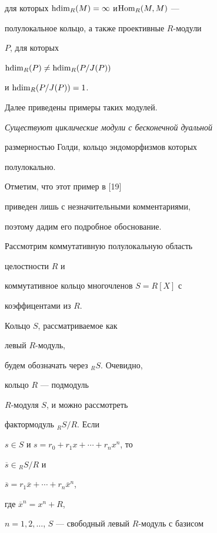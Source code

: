 для которых $\operatorname{hdim}_R(M)=\infty$ и\linebreak $\operatorname{Hom}_R(M,M)$ ---


полулокальное кольцо, а также проективные $R$-модули 


$P$, для которых\linebreak


$\operatorname{hdim}_R(P) \not =\operatorname{hdim}_R(P/J(P))$


и $\operatorname{hdim}_R(P/J(P))=1$. 


Далее приведены примеры таких модулей.





\begin{exam}


{\em Существуют циклические модули с бесконечной дуальной


размерностью Голди, кольцо эндоморфизмов которых


полулокально.}





Отметим, что этот пример в [19]


приведен лишь с незначительными комментариями,


поэтому дадим его подробное обоснование. 





Рассмотрим коммутативную полулокальную область 


целостности $R$ и 


коммутативное кольцо многочленов $S=R[X]$ с 


коэффицентами из $R$. 


Кольцо $S$, рассматриваемое как 


левый $R$-модуль,


будем обозначать через ${_R}S$. Очевидно,


кольцо $R$ --- подмодуль 


$R$-модуля $S$, и можно рассмотреть 


фактормодуль ${_R}S/R$. Если 


$s \in S$ и $s=r_0+r_1 x+ \dotsb +r_n x^n$, то 


$\overline {s} \in {_R}S/R$ и 


$\overline{s}=r_1 \overline{x}+ \dotsb +r_n \overline{x}^n$,


где $\overline{x}^n=x^n+R$,


$n=1,2, \dotsc$, $S$ --- свободный левый $R$-модуль с базисом 



\end{exam}

